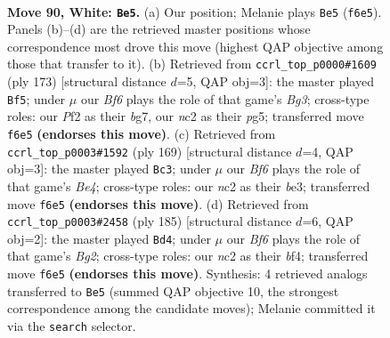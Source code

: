 \documentclass[11pt]{article}
\begin{document}
\clearpage

\begin{figure}[p]\centering
\begin{subfigure}{0.46\textwidth}\centering
\resizebox{\linewidth}{!}{%
\newchessgame
\chessboard[
  setfen={8/8/5B1k/8/2b4K/8/2n2P2/8 w - - 25 90},
  showmover=false,
  pgfstyle=straightmove, color=movearrow, markmove={f6-e5}
]}
\caption{}
\end{subfigure}\hfill
\begin{subfigure}{0.46\textwidth}\centering
\resizebox{\linewidth}{!}{%
\newchessgame
\chessboard[
  setfen={4k3/6B1/6b1/6P1/8/8/8/2K5 b - - 6 87},
  showmover=false,
  pgfstyle=straightmove, color=movearrow, markmove={g6-f5}
]}
\caption{}
\end{subfigure}
\\[4pt]
\begin{subfigure}{0.46\textwidth}\centering
\resizebox{\linewidth}{!}{%
\newchessgame
\chessboard[
  setfen={7k/8/4B1K1/4b3/4p3/4B3/8/8 b - - 31 85},
  showmover=false,
  pgfstyle=straightmove, color=movearrow, markmove={e5-c3}
]}
\caption{}
\end{subfigure}\hfill
\begin{subfigure}{0.46\textwidth}\centering
\resizebox{\linewidth}{!}{%
\newchessgame
\chessboard[
  setfen={8/6b1/8/8/4BB2/1K5p/8/k7 b - - 11 93},
  showmover=false,
  pgfstyle=straightmove, color=movearrow, markmove={g7-d4}
]}
\caption{}
\end{subfigure}
\caption{\textbf{Move 90, White: \texttt{Be5}.} (a) Our position; Melanie plays \texttt{Be5} (\texttt{f6e5}). Panels (b)--(d) are the retrieved master positions whose correspondence most drove this move (highest QAP objective among those that transfer to it). (b) Retrieved from \texttt{ccrl\_top\_p0000\#1609} (ply 173) [structural distance $d$=5, QAP obj=3]: the master played \texttt{Bf5}; under $\mu$ our \emph{Bf6} plays the role of that game's \emph{Bg3}; cross-type roles: our \emph{P}f2 as their \emph{b}g7, our \emph{n}c2 as their \emph{p}g5; transferred move \texttt{f6e5} \textbf{(endorses this move)}. (c) Retrieved from \texttt{ccrl\_top\_p0003\#1592} (ply 169) [structural distance $d$=4, QAP obj=3]: the master played \texttt{Bc3}; under $\mu$ our \emph{Bf6} plays the role of that game's \emph{Be4}; cross-type roles: our \emph{n}c2 as their \emph{b}e3; transferred move \texttt{f6e5} \textbf{(endorses this move)}. (d) Retrieved from \texttt{ccrl\_top\_p0003\#2458} (ply 185) [structural distance $d$=6, QAP obj=2]: the master played \texttt{Bd4}; under $\mu$ our \emph{Bf6} plays the role of that game's \emph{Bg2}; cross-type roles: our \emph{n}c2 as their \emph{b}f4; transferred move \texttt{f6e5} \textbf{(endorses this move)}. Synthesis: 4 retrieved analogs transferred to \texttt{Be5} (summed QAP objective 10, the strongest correspondence among the candidate moves); Melanie committed it via the \texttt{search} selector.}
\label{fig:thought-m178}
\end{figure}
\end{document}
